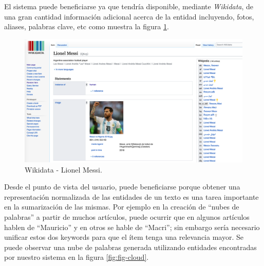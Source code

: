 \documentclass[12pt,a4paper,]{scrartcl}
\begin{document}
El sistema puede beneficiarse ya que tendría disponible, mediante \emph{Wikidata}, de una gran cantidad información adicional acerca de la entidad incluyendo, fotos, aliases, palabras clave, etc como muestra la figura \ref{fig:fig-messi}.

\begin{figure}[H]

{\centering \includegraphics{assets/wikidata_messi.pdf} 

}

\caption{Wikidata - Lionel Messi.}\label{fig:fig-messi}
\end{figure}

Desde el punto de vista del usuario, puede beneficiarse porque obtener una representación normalizada de las entidades de un texto es una tarea importante en la sumarización de las mismas. Por ejemplo en la creación de \enquote{nubes de palabras} a partir de muchos artículos, puede ocurrir que en algunos artículos hablen de \enquote{Mauricio} y en otros se hable de \enquote{Macri}; sin embargo sería necesario unificar estos dos keywords para que el ítem tenga una relevancia mayor. Se puede observar una nube de palabras generada utilizando entidades encontradas por nuestro sistema en la figura \ref{fig:fig-cloud}.
\end{document}
